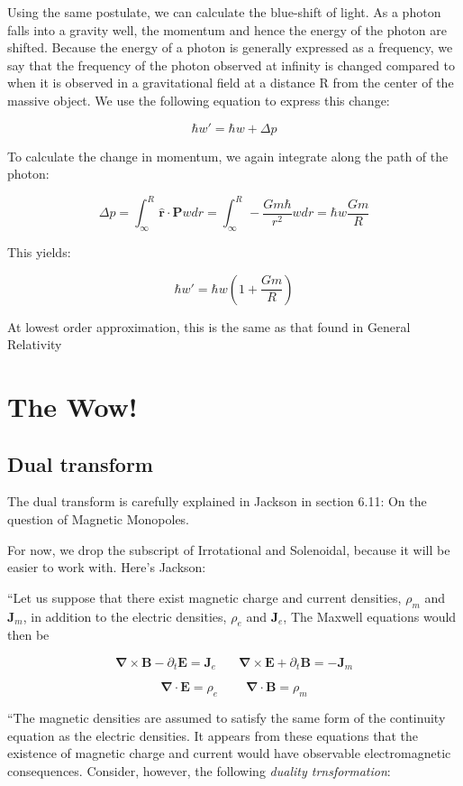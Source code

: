 \documentclass {article}
\renewcommand\vec{\mathbf}
\let\OldS\nabla
\renewcommand{\nabla}{\boldsymbol{\OldS}}
\let\OldHat\hat
\renewcommand{\hat}[1]{\OldHat{\mathbf{#1}}}
\begin{document}
Using the same postulate, we can calculate the blue-shift of light. As a photon falls into a gravity well, the momentum and hence the energy of the photon are shifted. Because the energy of a photon is generally expressed as a frequency, we say that the frequency of the photon observed at infinity is changed compared to when it is observed in a gravitational field at a distance R from the center of the massive object. We use the following equation to express this change:

$$\hbar w' = \hbar w + \Delta p $$

To calculate the change in momentum, we again integrate along the path of the photon:

$$\Delta p = \int_{\infty}^R \hat r \cdot \vec P w dr= \int_{\infty}^R - \frac {Gm\hbar}{r^2} w dr = \hbar w \frac {Gm}R $$

This yields:

$$\hbar w' = \hbar w \left( 1 + \frac {Gm}R \right) $$

At lowest order approximation, this is the same as that found in General Relativity

\newpage

\section{The Wow!}
\subsection{Dual transform}

The dual transform is carefully explained in Jackson in section 6.11: On the question of Magnetic Monopoles.

For now, we drop the subscript of Irrotational and Solenoidal, because it will be easier to work with. Here's Jackson:

``Let us suppose that there exist magnetic charge and current densities, $\rho_m$ and $\vec J_m$, in addition  to the electric densities, $\rho_e$ and $\vec J_e$, The Maxwell equations would then be

$$\nabla \times \vec B  - \partial_t \vec E  = \vec J_e  ~~~~~~~~ \nabla \times \vec E + \partial_t \vec B =  - \vec J_m   $$

$$\nabla \cdot \vec E = \rho_e ~~~~~~~~~~ \nabla \cdot \vec B =  \rho_m $$

``The magnetic densities are assumed to satisfy the same form of the continuity equation as the electric densities. It appears from these equations that the existence of magnetic charge and current would have observable electromagnetic consequences. Consider, however, the following \textit{duality trnsformation}:
\end{document}
